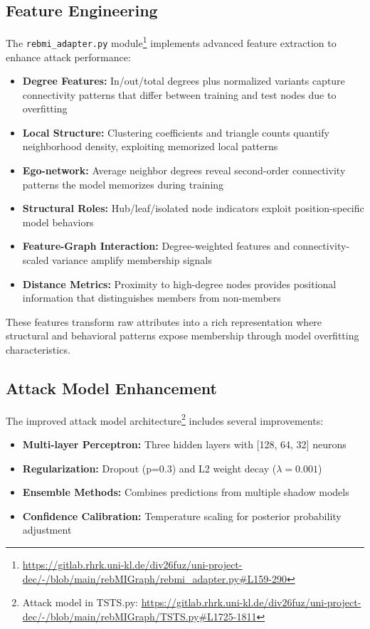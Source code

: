 \documentclass{article}
\begin{document}
\subsection{Feature Engineering}
The \texttt{rebmi\_adapter.py} module\footnote{\url{https://gitlab.rhrk.uni-kl.de/div26fuz/uni-project-dec/-/blob/main/rebMIGraph/rebmi_adapter.py\#L159-290}} implements advanced feature extraction to enhance attack performance:

\begin{itemize}
\item \textbf{Degree Features:} In/out/total degrees plus normalized variants capture connectivity patterns that differ between training and test nodes due to overfitting
\item \textbf{Local Structure:} Clustering coefficients and triangle counts quantify neighborhood density, exploiting memorized local patterns
\item \textbf{Ego-network:} Average neighbor degrees reveal second-order connectivity patterns the model memorizes during training
\item \textbf{Structural Roles:} Hub/leaf/isolated node indicators exploit position-specific model behaviors
\item \textbf{Feature-Graph Interaction:} Degree-weighted features and connectivity-scaled variance amplify membership signals
\item \textbf{Distance Metrics:} Proximity to high-degree nodes provides positional information that distinguishes members from non-members
\end{itemize}

These features transform raw attributes into a rich representation where structural and behavioral patterns expose membership through model overfitting characteristics.

\subsection{Attack Model Enhancement}
The improved attack model architecture\footnote{Attack model in TSTS.py: \url{https://gitlab.rhrk.uni-kl.de/div26fuz/uni-project-dec/-/blob/main/rebMIGraph/TSTS.py\#L1725-1811}} includes several improvements:

\begin{itemize}
\item \textbf{Multi-layer Perceptron:} Three hidden layers with [128, 64, 32] neurons
\item \textbf{Regularization:} Dropout (p=0.3) and L2 weight decay ($\lambda=0.001$)
\item \textbf{Ensemble Methods:} Combines predictions from multiple shadow models
\item \textbf{Confidence Calibration:} Temperature scaling for posterior probability adjustment
\end{itemize}
\end{document}
